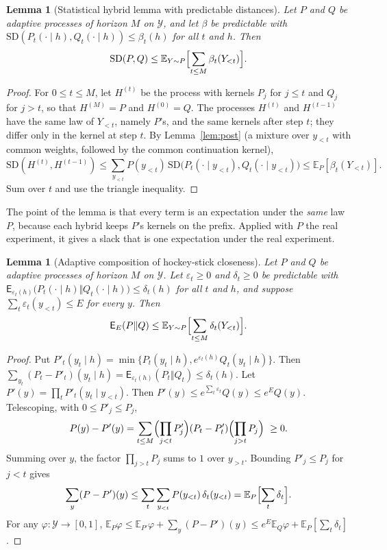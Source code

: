 \documentclass[11pt]{article}
\theoremstyle{definition}
\theoremstyle{plain}
\newtheorem{lemma}[definition]{Lemma}
\newcommand{\Ex}{\mathbb{E}}
\newcommand{\SD}{\mathrm{SD}}
\newcommand{\HSd}{\mathsf{E}}
\begin{document}
\begin{lemma}[Statistical hybrid lemma with predictable distances]\label{lem:sdhyb}
Let $P$ and $Q$ be adaptive processes of horizon $M$ on $\mathcal Y$, and let $\beta$ be predictable with $\SD(P_t(\cdot\mid h),Q_t(\cdot\mid h))\le\beta_t(h)$ for all $t$ and $h$. Then
\[
  \SD(P,Q)\le\Ex_{Y\sim P}\Bigl[\sum_{t\le M}\beta_t(Y_{<t})\Bigr].
\]
\end{lemma}
\begin{proof}
For $0\le t\le M$, let $H^{(t)}$ be the process with kernels $P_j$ for $j\le t$ and $Q_j$ for $j>t$, so that $H^{(M)}=P$ and $H^{(0)}=Q$. The processes $H^{(t)}$ and $H^{(t-1)}$ have the same law of $Y_{<t}$, namely $P$'s, and the same kernels after step $t$; they differ only in the kernel at step $t$. By Lemma~\ref{lem:post} (a mixture over $y_{<t}$ with common weights, followed by the common continuation kernel),
\[
  \SD(H^{(t)},H^{(t-1)})\le\sum_{y_{<t}}P(y_{<t})\,\SD\bigl(P_t(\cdot\mid y_{<t}),Q_t(\cdot\mid y_{<t})\bigr)\le\Ex_P[\beta_t(Y_{<t})] .
\]
Sum over $t$ and use the triangle inequality.
\end{proof}

The point of the lemma is that every term is an expectation under the \emph{same} law $P$, because each hybrid keeps $P$'s kernels on the prefix. Applied with $P$ the real experiment, it gives a slack that is one expectation under the real experiment.

\begin{lemma}[Adaptive composition of hockey-stick closeness]\label{lem:hscomp}
Let $P$ and $Q$ be adaptive processes of horizon $M$ on $\mathcal Y$. Let $\varepsilon_t\ge0$ and $\delta_t\ge0$ be predictable with $\HSd_{\varepsilon_t(h)}\bigl(P_t(\cdot\mid h)\Vert Q_t(\cdot\mid h)\bigr)\le\delta_t(h)$ for all $t$ and $h$, and suppose $\sum_t\varepsilon_t(y_{<t})\le E$ for every $y$. Then
\[
  \HSd_E(P\Vert Q)\le\Ex_{Y\sim P}\Bigl[\sum_{t\le M}\delta_t(Y_{<t})\Bigr].
\]
\end{lemma}
\begin{proof}
Put $P'_t(y_t\mid h)=\min\{P_t(y_t\mid h),e^{\varepsilon_t(h)}Q_t(y_t\mid h)\}$. Then $\sum_{y_t}(P_t-P'_t)(y_t\mid h)=\HSd_{\varepsilon_t(h)}(P_t\Vert Q_t)\le\delta_t(h)$. Let $P'(y)=\prod_tP'_t(y_t\mid y_{<t})$. Then $P'(y)\le e^{\sum_t\varepsilon_t}Q(y)\le e^EQ(y)$. Telescoping, with $0\le P'_j\le P_j$,
\[
  P(y)-P'(y)=\sum_{t\le M}\Bigl(\prod_{j<t}P'_j\Bigr)(P_t-P'_t)\Bigl(\prod_{j>t}P_j\Bigr)\ \ge0 .
\]
Summing over $y$, the factor $\prod_{j>t}P_j$ sums to $1$ over $y_{>t}$. Bounding $P'_j\le P_j$ for $j<t$ gives
\[
  \sum_y(P-P')(y)\le\sum_t\sum_{y_{<t}}P(y_{<t})\,\delta_t(y_{<t})=\Ex_P\Bigl[\sum_t\delta_t\Bigr].
\]
For any $\varphi:\mathcal Y\to[0,1]$, $\Ex_P\varphi\le\Ex_{P'}\varphi+\sum_y(P-P')(y)\le e^E\Ex_Q\varphi+\Ex_P[\sum_t\delta_t]$.
\end{proof}
\end{document}
